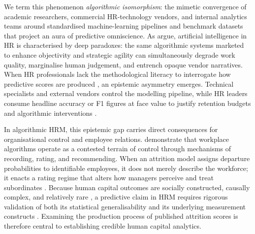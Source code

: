 \documentclass[12pt,a4paper]{article}
\begin{document}
We term this phenomenon \textit{algorithmic isomorphism}: the mimetic convergence of academic researchers, commercial HR-technology vendors, and internal analytics teams around standardised machine-learning pipelines and benchmark datasets that project an aura of predictive omniscience. As \textcite{ref54} argue, artificial intelligence in HR is characterised by deep paradoxes: the same algorithmic systems marketed to enhance objectivity and strategic agility can simultaneously degrade work quality, marginalise human judgement, and entrench opaque vendor narratives. When HR professionals lack the methodological literacy to interrogate how predictive scores are produced \parencite{ref50,ref56}, an epistemic asymmetry emerges. Technical specialists and external vendors control the modelling pipeline, while HR leaders consume headline accuracy or F1 figures at face value to justify retention budgets and algorithmic interventions \parencite{ref45,ref55,ref53}.

In algorithmic HRM, this epistemic gap carries direct consequences for organisational control and employee relations. \textcite{ref58} demonstrate that workplace algorithms operate as a contested terrain of control through mechanisms of recording, rating, and recommending. When an attrition model assigns departure probabilities to identifiable employees, it does not merely describe the workforce; it enacts a rating regime that alters how managers perceive and treat subordinates \parencite{ref61,ref60}. Because human capital outcomes are socially constructed, causally complex, and relatively rare \parencite{ref45}, a predictive claim in HRM requires rigorous validation of both its statistical generalisability and its underlying measurement constructs \parencite{ref56,ref53}. Examining the production process of published attrition scores is therefore central to establishing credible human capital analytics.
\end{document}
